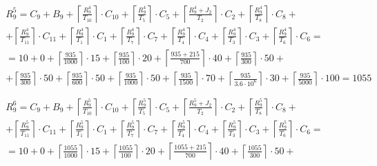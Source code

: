 \begin{gather*}
  \begin{multlined}
    R_9^5 = C_9 + B_9 + \left\lceil\frac{R_9^4}{T_{10}}\right\rceil\cdot C_{10} + %
    \left\lceil\frac{R_9^4}{T_5}\right\rceil\cdot C_5 + %
    \left\lceil\frac{R_9^4 + J_2}{T_2}\right\rceil\cdot C_2 + %
    \left\lceil\frac{R_9^4}{T_8}\right\rceil\cdot C_8 + \\%
    + \left\lceil\frac{R_9^4}{T_{11}}\right\rceil\cdot C_{11} + %
    \left\lceil\frac{R_9^4}{T_1}\right\rceil\cdot C_1 +%
    \left\lceil\frac{R_9^4}{T_7}\right\rceil\cdot C_7 +%
    \left\lceil\frac{R_9^4}{T_4}\right\rceil\cdot C_4 +%
    \left\lceil\frac{R_9^4}{T_3}\right\rceil\cdot C_3 +%
    \left\lceil\frac{R_9^4}{T_6}\right\rceil\cdot C_6 = \\%
    = 10 + 0 + \left\lceil\frac{935}{1000}\right\rceil\cdot 15 + %
    \left\lceil\frac{935}{100}\right\rceil\cdot 20 + %
    \left\lceil\frac{935 + 215}{700}\right\rceil\cdot 40 + %
    \left\lceil\frac{935}{300}\right\rceil\cdot 50 + \\%
    + \left\lceil\frac{935}{300}\right\rceil\cdot 50 + %
    \left\lceil\frac{935}{600}\right\rceil\cdot 50 + %
    \left\lceil\frac{935}{1000}\right\rceil\cdot 50 +%
    \left\lceil\frac{935}{1500}\right\rceil\cdot 70 +%
    \left\lceil\frac{935}{3.6 \cdot 10^6}\right\rceil\cdot 30 +%
    \left\lceil\frac{935}{5000}\right\rceil\cdot 100 = 1055 \\
  \end{multlined} \\
  \begin{multlined}
    R_9^6 = C_9 + B_9 + \left\lceil\frac{R_9^5}{T_{10}}\right\rceil\cdot C_{10} + %
    \left\lceil\frac{R_9^5}{T_5}\right\rceil\cdot C_5 + %
    \left\lceil\frac{R_9^5 + J_2}{T_2}\right\rceil\cdot C_2 + %
    \left\lceil\frac{R_9^5}{T_8}\right\rceil\cdot C_8 + \\%
    + \left\lceil\frac{R_9^5}{T_{11}}\right\rceil\cdot C_{11} + %
    \left\lceil\frac{R_9^5}{T_1}\right\rceil\cdot C_1 +%
    \left\lceil\frac{R_9^5}{T_7}\right\rceil\cdot C_7 +%
    \left\lceil\frac{R_9^5}{T_4}\right\rceil\cdot C_4 +%
    \left\lceil\frac{R_9^5}{T_3}\right\rceil\cdot C_3 +%
    \left\lceil\frac{R_9^5}{T_6}\right\rceil\cdot C_6 = \\%
    = 10 + 0 + \left\lceil\frac{1055}{1000}\right\rceil\cdot 15 + %
    \left\lceil\frac{1055}{100}\right\rceil\cdot 20 + %
    \left\lceil\frac{1055 + 215}{700}\right\rceil\cdot 40 + %
    \left\lceil\frac{1055}{300}\right\rceil\cdot 50 + \\%

\end{multlined}
\end{gather*}

